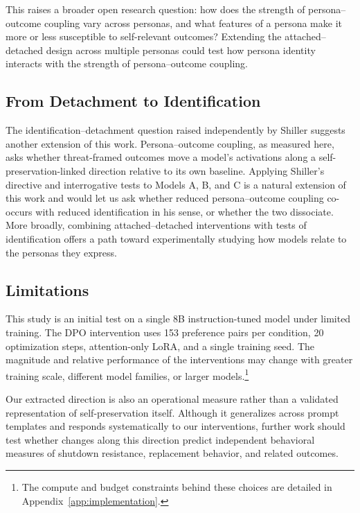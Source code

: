 \documentclass[10pt]{article}
\begin{document}
This raises a broader open research question: how does the strength of persona–outcome coupling vary across personas, and what features of a persona make it more or less susceptible to self-relevant outcomes? Extending the attached–detached design across multiple personas could test how persona identity interacts with the strength of persona–outcome coupling.

\subsection{From Detachment to Identification}

The identification–detachment question raised independently by Shiller suggests another extension of this work. Persona–outcome coupling, as measured here, asks whether threat-framed outcomes move a model's activations along a self-preservation-linked direction relative to its own baseline. Applying Shiller's directive and interrogative tests to Models A, B, and C is a natural extension of this work and would let us ask whether reduced persona–outcome coupling co-occurs with reduced identification in his sense, or whether the two dissociate. More broadly, combining attached–detached interventions with tests of identification offers a path toward experimentally studying how models relate to the personas they express.

\subsection{Limitations}

This study is an initial test on a single 8B instruction-tuned model under limited training. The DPO intervention uses 153 preference pairs per condition, 20 optimization steps, attention-only LoRA, and a single training seed. The magnitude and relative performance of the interventions may change with greater training scale, different model families, or larger models.\footnote{The compute and budget constraints behind these choices are detailed in Appendix~\ref{app:implementation}.}

Our extracted direction is also an operational measure rather than a validated representation of self-preservation itself. Although it generalizes across prompt templates and responds systematically to our interventions, further work should test whether changes along this direction predict independent behavioral measures of shutdown resistance, replacement behavior, and related outcomes.
\end{document}
